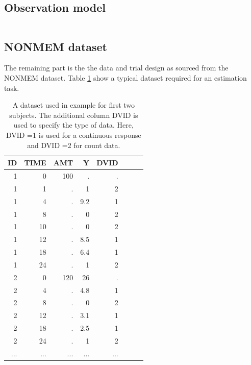 \subsection{Observation model}

\lstset{language=XML}
\begin{lstlisting}

\end{lstlisting}



\subsection{NONMEM dataset}
\label{sec:eg8-NONMEMdataset}
The remaining part is the the data and trial design as sourced from the 
NONMEM dataset. Table \ref{tab:example8_dataSet} show a typical dataset required for 
an estimation task.
\begin{table}[htdp]
\begin{center}
\small
\renewcommand{\arraystretch}{1.1}%
\begin{tabular}{rrrrrrrr}\toprule
ID 	& TIME	& AMT	& Y		& DVID \\ \midrule
1 	& 0 		& 100 	& . 		& . \\ 
1 	& 1 		& . 		& 1	 	& 2 \\ 
1 	& 4 		& . 		& 9.2 	& 1 \\ 
1 	& 8 		& . 		& 0 		& 2 \\ 
1 	& 10		& . 		& 0	 	& 2 \\ 
1 	& 12 	& . 		& 8.5 	& 1 \\ 
1 	& 18 	& . 		& 6.4 	& 1 \\ 
1 	& 24 	& . 		& 1 		& 2 \\ 
2 	& 0 		& 120	&  26 	& . \\ 
2 	& 4 		& . 		& 4.8 	& 1 \\ 
2 	& 8 		& . 		& 0 		& 2 \\ 
2 	& 12 	& . 		& 3.1 	& 1 \\ 
2 	& 18 	& . 		& 2.5 	& 1 \\ 
2 	& 24 	& . 		& 1 		& 2 \\ 
...	& ...		& ...		& ...		& ...	\\ \bottomrule
\end{tabular}
\end{center}
\caption{A dataset used in example for first two subjects.
The additional column DVID is used to specify the type of data. Here, 
DVID =1 is used for a continuous response and DVID =2 for count data.}
\label{tab:example8_dataSet}
\end{table}%



